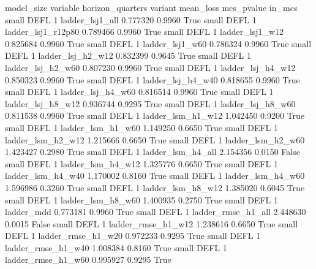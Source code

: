 model_size variable  horizon_quarters                  variant  mean_loss  mcs_pvalue  in_mcs
     small     DEFL                 1          ladder_lsj1_all   0.777320      0.9960    True
     small     DEFL                 1       ladder_lsj1_r12p80   0.789466      0.9960    True
     small     DEFL                 1          ladder_lsj1_w12   0.825684      0.9960    True
     small     DEFL                 1          ladder_lsj1_w60   0.786324      0.9960    True
     small     DEFL                 1        ladder_lsj_h2_w12   0.832399      0.9645    True
     small     DEFL                 1        ladder_lsj_h2_w60   0.807230      0.9960    True
     small     DEFL                 1        ladder_lsj_h4_w12   0.850323      0.9960    True
     small     DEFL                 1        ladder_lsj_h4_w40   0.818655      0.9960    True
     small     DEFL                 1        ladder_lsj_h4_w60   0.816514      0.9960    True
     small     DEFL                 1        ladder_lsj_h8_w12   0.936744      0.9295    True
     small     DEFL                 1        ladder_lsj_h8_w60   0.811538      0.9960    True
     small     DEFL                 1        ladder_lsm_h1_w12   1.042450      0.9200    True
     small     DEFL                 1        ladder_lsm_h1_w60   1.149250      0.6650    True
     small     DEFL                 1        ladder_lsm_h2_w12   1.215666      0.6650    True
     small     DEFL                 1        ladder_lsm_h2_w60   1.423427      0.2980    True
     small     DEFL                 1        ladder_lsm_h4_all   2.154356      0.0150   False
     small     DEFL                 1        ladder_lsm_h4_w12   1.325776      0.6650    True
     small     DEFL                 1        ladder_lsm_h4_w40   1.170002      0.8160    True
     small     DEFL                 1        ladder_lsm_h4_w60   1.596986      0.3260    True
     small     DEFL                 1        ladder_lsm_h8_w12   1.385020      0.6045    True
     small     DEFL                 1        ladder_lsm_h8_w60   1.400935      0.2750    True
     small     DEFL                 1               ladder_mdd   0.773181      0.9960    True
     small     DEFL                 1       ladder_rmse_h1_all   2.448630      0.0015   False
     small     DEFL                 1       ladder_rmse_h1_w12   1.238616      0.6650    True
     small     DEFL                 1       ladder_rmse_h1_w20   0.972233      0.9295    True
     small     DEFL                 1       ladder_rmse_h1_w40   1.008384      0.8160    True
     small     DEFL                 1       ladder_rmse_h1_w60   0.995927      0.9295    True
